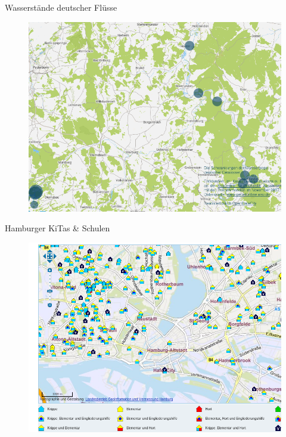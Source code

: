 \begin{frame}[t]{Wasserstände deutscher Flüsse}
\begin{figure}[h]
 \centering
 \includegraphics[scale=0.3]{section_other_ok_labs_rivers.png}
\end{figure}
\end{frame}

\begin{frame}[t]{Hamburger KiTas \& Schulen}
\begin{figure}[h]
 \centering
 \includegraphics[scale=0.3]{section_other_ok_labs_schools.png}
\end{figure}
\end{frame}

